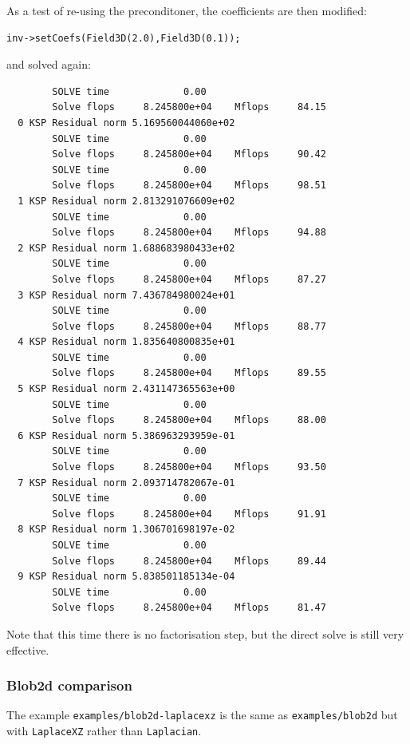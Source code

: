 \documentclass[12pt]{article}
\begin{document}
As a test of re-using the preconditoner, the coefficients are then modified:
%
\begin{lstlisting}[numbers=none]
  inv->setCoefs(Field3D(2.0),Field3D(0.1));
\end{lstlisting}
%
and solved again:
%
\begin{verbatim}
        SOLVE time             0.00
        Solve flops     8.245800e+04    Mflops     84.15
  0 KSP Residual norm 5.169560044060e+02
        SOLVE time             0.00
        Solve flops     8.245800e+04    Mflops     90.42
        SOLVE time             0.00
        Solve flops     8.245800e+04    Mflops     98.51
  1 KSP Residual norm 2.813291076609e+02
        SOLVE time             0.00
        Solve flops     8.245800e+04    Mflops     94.88
  2 KSP Residual norm 1.688683980433e+02
        SOLVE time             0.00
        Solve flops     8.245800e+04    Mflops     87.27
  3 KSP Residual norm 7.436784980024e+01
        SOLVE time             0.00
        Solve flops     8.245800e+04    Mflops     88.77
  4 KSP Residual norm 1.835640800835e+01
        SOLVE time             0.00
        Solve flops     8.245800e+04    Mflops     89.55
  5 KSP Residual norm 2.431147365563e+00
        SOLVE time             0.00
        Solve flops     8.245800e+04    Mflops     88.00
  6 KSP Residual norm 5.386963293959e-01
        SOLVE time             0.00
        Solve flops     8.245800e+04    Mflops     93.50
  7 KSP Residual norm 2.093714782067e-01
        SOLVE time             0.00
        Solve flops     8.245800e+04    Mflops     91.91
  8 KSP Residual norm 1.306701698197e-02
        SOLVE time             0.00
        Solve flops     8.245800e+04    Mflops     89.44
  9 KSP Residual norm 5.838501185134e-04
        SOLVE time             0.00
        Solve flops     8.245800e+04    Mflops     81.47
\end{verbatim}
%
Note that this time there is no factorisation step, but the direct solve is
still very effective.


\subsubsection{Blob2d comparison}
%
The example \texttt{examples/blob2d-laplacexz} is the same as
\texttt{examples/blob2d} but with \texttt{LaplaceXZ} rather than
\texttt{Laplacian}.
\end{document}
